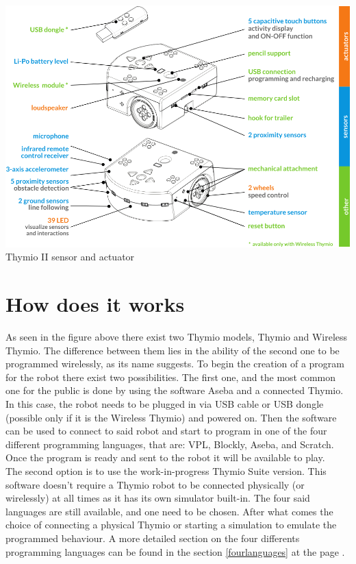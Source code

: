\documentclass{scrbook}
\begin{document}
\begin{center}
  \includegraphics[width=\textwidth]{Wireless-thymioII-sensor-actuator-color-en}\\
  Thymio II sensor and actuator
\end{center}

\section{How does it works \label{howdoesitworkref}} 

As seen in the figure above there exist two Thymio models, Thymio and Wireless Thymio. 
The difference between them lies in the ability of the second one to be programmed wirelessly, 
as its name suggests. To begin the creation of a program for the robot there exist two possibilities.
The first one, and the most common one for the public is done by using the software Aseba and a connected Thymio. 
In this case, the robot needs to be plugged in via USB cable or USB dongle (possible only if it is the Wireless Thymio) and powered on. 
Then the software can be used to connect to said robot and start to program in one of the four different programming languages, 
that are: VPL, Blockly, Aseba, and Scratch. Once the program is ready and sent to the robot it will be available to play. \\

The second option is to use the work-in-progress Thymio Suite version. 
This software doesn’t require a Thymio robot to be connected physically (or wirelessly) at all times as it has its own simulator built-in. 
The four said languages are still available, and one need to be chosen. 
After what comes the choice of connecting a physical Thymio or starting a simulation to emulate the programmed behaviour.
A more detailed section on the four differents programming languages can be found in the section \ref{fourlanguages} at the page \pageref{fourlanguages}.
\end{document}
